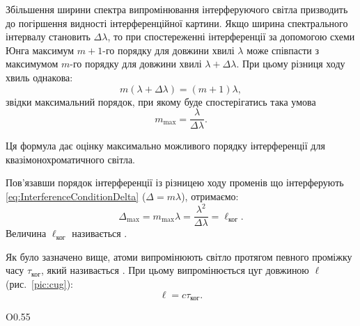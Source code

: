 Збільшення ширини спектра випромінювання інтерферуючого світла
призводить до погіршення видності інтерференційної картини. Якщо
ширина спектрального інтервалу становить $\Delta\lambda$, то при спостереженні інтерференції за допомогою схеми Юнга максимум $m + 1$-го порядку для довжини хвилі $\lambda$ може співпасти з максимумом $m$-го порядку для
довжини хвилі $\lambda + \Delta\lambda$. При цьому різниця ходу хвиль однакова:
\begin{equation}
	m (\lambda + \Delta\lambda) = (m + 1)\lambda,
\end{equation}
звідки максимальний порядок, при якому буде спостерігатись така умова
\begin{equation*}\label{eq:max_interf_resol}
	m_{\max} = \frac{\lambda}{\Delta\lambda} .
\end{equation*}

Ця формула дає оцінку максимально можливого порядку
інтерференції для квазімонохроматичного світла.

Пов'язавши порядок інтерференції із різницею ходу
променів що інтерферують \eqref{eq:InterferenceConditionDelta} ($\Delta = m\lambda $), отримаємо:
\begin{equation}\label{eq:coherence_length}
	\Delta_{\max} =  m_{\max}\lambda = \frac{\lambda^2}{\Delta\lambda}  =  \ell_\text{ког}.
\end{equation}
Величина $ \ell_\text{ког} $ називається .


Як було зазначено вище, атоми випромінюють світло протягом певного проміжку часу $\tau_\text{ког}$, який називається . При цьому випромінюється цуг довжиною $ \ell $ (рис.~\ref{pic:cug}):
\begin{equation}\label{eq:cug_length}
	\ell = c\tau_\text{ког}.
\end{equation}

\begin{wrapfigure}{O}{0.55\linewidth}\centering
\caption{Цуг хвилі.}
\label{pic:cug}
\end{wrapfigure}


